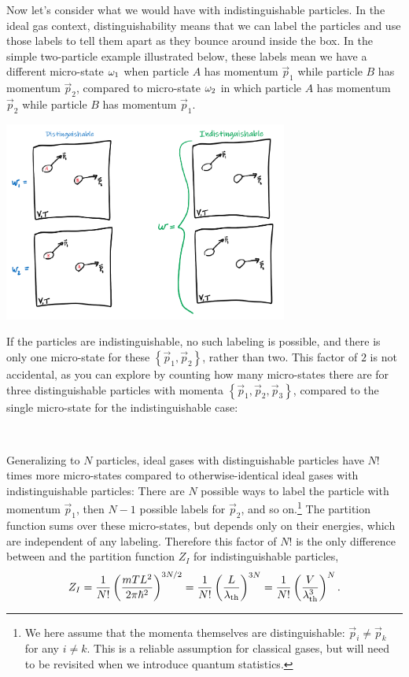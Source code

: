 Now let's consider what we would have with indistinguishable particles.
In the ideal gas context, distinguishability means that we can label the particles and use those labels to tell them apart as they bounce around inside the box.
In the simple two-particle example illustrated below, these labels mean we have a different micro-state $\omega_1$ when particle $A$ has momentum $\vec p_1$ while particle $B$ has momentum $\vec p_2$, compared to micro-state $\omega_2$ in which particle $A$ has momentum $\vec p_2$ while particle $B$ has momentum $\vec p_1$.
\begin{center}
  \includegraphics[width=0.7\textwidth]{figs/week04_distinguish.pdf}
\end{center}
If the particles are indistinguishable, no such labeling is possible, and there is only one micro-state for these $\left\{\vec p_1, \vec p_2\right\}$, rather than two.
This factor of $2$ is not accidental, as you can explore by counting how many micro-states there are for three distinguishable particles with momenta $\left\{\vec p_1, \vec p_2, \vec p_3\right\}$, compared to the single micro-state for the indistinguishable case:
\begin{mdframed}
  \ \\[100 pt]
\end{mdframed}

Generalizing to $N$ particles, ideal gases with distinguishable particles have $N!$ times more micro-states compared to otherwise-identical ideal gases with indistinguishable particles: There are $N$ possible ways to label the particle with momentum $\vec{p}_1$, then $N - 1$ possible labels for $\vec{p}_2$, and so on.\footnote{We here assume that the momenta themselves are distinguishable: $\vec{p}_i \neq \vec{p}_k$ for any $i \neq k$.  This is a reliable assumption for classical gases, but will need to be revisited when we introduce quantum statistics.}
The partition function sums over these micro-states, but depends only on their energies, which are independent of any labeling.
Therefore this factor of $N!$ is the only difference between  and the partition function $Z_I$ for indistinguishable particles,
\begin{equation}
  \label{eq:ideal_indis}
  Z_I = \frac{1}{N!} \left(\frac{mTL^2}{2\pi\hbar^2}\right)^{3N / 2} = \frac{1}{N!} \left(\frac{L}{\lambda_{\mathrm{th}}}\right)^{3N} = \frac{1}{N!} \left(\frac{V}{\lambda_{\mathrm{th}}^3}\right)^N.
\end{equation}



